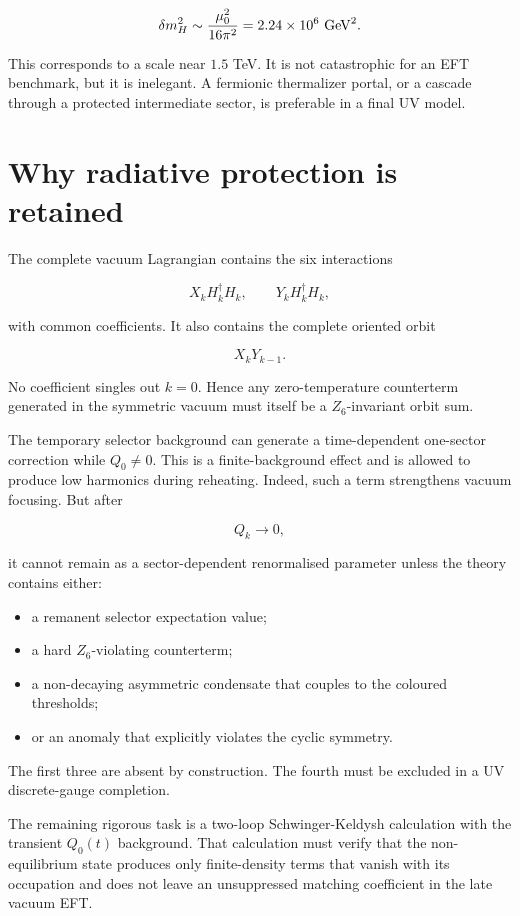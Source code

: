 \documentclass[
  10pt,
]{article}
\providecommand{\tightlist}{%
  \setlength{\itemsep}{0pt}\setlength{\parskip}{0pt}}
\begin{document}
\[
\delta m_H^2
\sim
\frac{\mu_0^2}{16\pi^2}
=2.24\times10^6\ {\rm GeV}^2.
\]

This corresponds to a scale near \(1.5\) TeV. It is not catastrophic for
an EFT benchmark, but it is inelegant. A fermionic thermalizer portal,
or a cascade through a protected intermediate sector, is preferable in a
final UV model.

\section{Why radiative protection is
retained}\label{why-radiative-protection-is-retained}

The complete vacuum Lagrangian contains the six interactions

\[
X_kH_k^\dagger H_k,
\qquad
Y_kH_k^\dagger H_k,
\]

with common coefficients. It also contains the complete oriented orbit

\[
X_kY_{k-1}.
\]

No coefficient singles out \(k=0\). Hence any zero-temperature
counterterm generated in the symmetric vacuum must itself be a
\(Z_6\)-invariant orbit sum.

The temporary selector background can generate a time-dependent
one-sector correction while \(Q_0\neq0\). This is a finite-background
effect and is allowed to produce low harmonics during reheating. Indeed,
such a term strengthens vacuum focusing. But after

\[
Q_k\to0,
\]

it cannot remain as a sector-dependent renormalised parameter unless the
theory contains either:

\begin{itemize}
\tightlist
\item
  a remanent selector expectation value;
\item
  a hard \(Z_6\)-violating counterterm;
\item
  a non-decaying asymmetric condensate that couples to the coloured
  thresholds;
\item
  or an anomaly that explicitly violates the cyclic symmetry.
\end{itemize}

The first three are absent by construction. The fourth must be excluded
in a UV discrete-gauge completion.

The remaining rigorous task is a two-loop Schwinger-Keldysh calculation
with the transient \(Q_0(t)\) background. That calculation must verify
that the non-equilibrium state produces only finite-density terms that
vanish with its occupation and does not leave an unsuppressed matching
coefficient in the late vacuum EFT.
\end{document}
